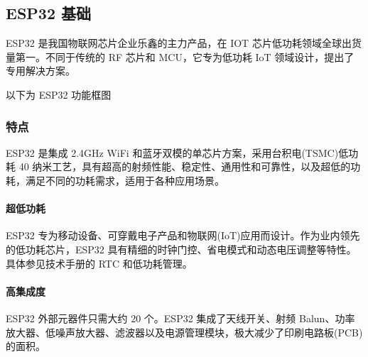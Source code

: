 \documentclass[a4paper,12pt,english]{sphinxmanual}
\begin{document}
\sphinxstepscope


\subsection{ESP32 基础}
\label{\detokenize{dev-board/esp32:esp32}}\label{\detokenize{dev-board/esp32::doc}}
\sphinxAtStartPar
ESP32 是我国物联网芯片企业乐鑫的主力产品，在 IOT 芯片低功耗领域全球出货量第一。不同于传统的 RF 芯片和 MCU，它专为低功耗 IoT 领域设计，提出了专用解决方案。

\sphinxAtStartPar
以下为 ESP32 功能框图

\sphinxAtStartPar
{}


\subsubsection{特点}
\label{\detokenize{dev-board/esp32:id1}}
\sphinxAtStartPar
ESP32 是集成 2.4GHz Wi\sphinxhyphen{}Fi 和蓝牙双模的单芯片方案，采用台积电(TSMC)低功耗 40 纳米工艺，具有超高的射频性能、稳定性、通用性和可靠性，以及超低的功耗，满足不同的功耗需求，适用于各种应用场景。


\paragraph{超低功耗}
\label{\detokenize{dev-board/esp32:id2}}
\sphinxAtStartPar
ESP32 专为移动设备、可穿戴电子产品和物联网(IoT)应用而设计。作为业内领先的低功耗芯片，ESP32 具有精细的时钟门控、省电模式和动态电压调整等特性。具体参见技术手册的 RTC 和低功耗管理。


\paragraph{高集成度}
\label{\detokenize{dev-board/esp32:id3}}
\sphinxAtStartPar
ESP32 外部元器件只需大约 20 个。ESP32 集成了天线开关、射频 Balun、功率放大器、低噪声放大器、滤波器以及电源管理模块，极大减少了印刷电路板(PCB)的面积。
\end{document}
